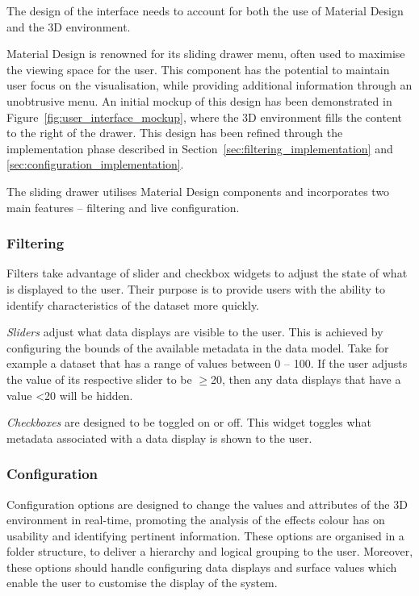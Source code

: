 {{		The design of the interface needs to account for both the use of Material Design and the 3D environment. 

		Material Design is renowned for its sliding drawer menu, often used to maximise the viewing space for the user. This component has the potential to maintain user focus on the visualisation, while providing additional information through an unobtrusive menu. An initial mockup of this design has been demonstrated in Figure~\ref{fig:user_interface_mockup}, where the 3D environment fills the content to the right of the drawer. This design has been refined through the implementation phase described in Section~\ref{sec:filtering_implementation} and \ref{sec:configuration_implementation}.

		

		The sliding drawer utilises Material Design components and incorporates two main features -- filtering and live configuration.

		\subsubsection{Filtering} {
		\label{sec:filtering}

			Filters take advantage of slider and checkbox widgets to adjust the state of what is displayed to the user. Their purpose is to provide users with the ability to identify characteristics of the dataset more quickly.

			\emph{Sliders} adjust what data displays are visible to the user. This is achieved by configuring the bounds of the available metadata in the data model. Take for example a dataset that has a range of values between 0 -- 100. If the user adjusts the value of its respective slider to be $\ge$20, then any data displays that have a value \textless20 will be hidden.
			
			\emph{Checkboxes} are designed to be toggled on or off. This widget toggles what metadata associated with a data display is shown to the user.

		}

		\subsubsection{Configuration} {
		\label{sec:configuration}

			Configuration options are designed to change the values and attributes of the 3D environment in real-time, promoting the analysis of the effects colour has on usability and identifying pertinent information. These options are organised in a folder structure, to deliver a hierarchy and logical grouping to the user. Moreover, these options should handle configuring data displays and surface values which enable the user to customise the display of the system.

}}}
